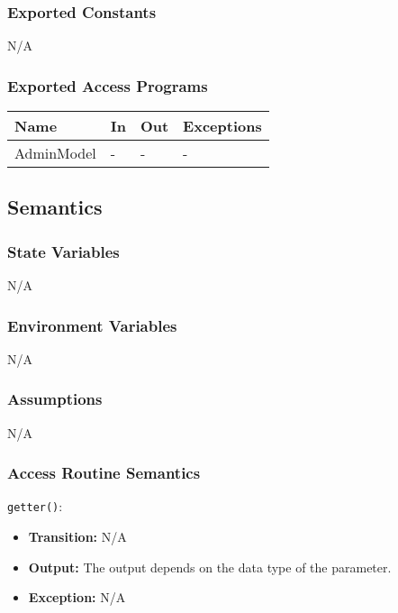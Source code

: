 \documentclass[12pt, titlepage]{article}
\begin{document}
\subsubsection{Exported Constants}

N/A

\subsubsection{Exported Access Programs}

\begin{center}
\begin{tabular}{p{3cm} p{4cm} p{4cm} p{3.5cm}}
\hline
\textbf{Name} & \textbf{In} & \textbf{Out} & \textbf{Exceptions} \\
\hline
AdminModel & - & - & - & \\ 
\hline
\end{tabular}
\end{center}

\subsection{Semantics}

\subsubsection{State Variables}

N/A

\subsubsection{Environment Variables}

N/A

\subsubsection{Assumptions}

N/A

\subsubsection{Access Routine Semantics}

\noindent \texttt{getter()}:
\begin{itemize}
    \item \textbf{Transition:} N/A
    \item \textbf{Output:} The output depends on the data type of the parameter.
    \item \textbf{Exception:} N/A
\end{itemize}
\end{document}
